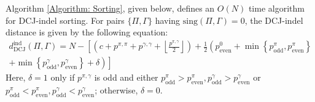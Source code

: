 \begin{theorem}
Algorithm \ref{Algorithm: Sorting}, given below, defines an $O(N)$ time algorithm for DCJ-indel sorting.  For pairs $\{\Pi, \Gamma\}$ having $\mathrm{sing}(\Pi, \Gamma) = 0$, the DCJ-indel distance is given by the following equation:
\begin{multline}
d_{\mathrm{DCJ}}^{\mathrm{ind}}(\Pi, \Gamma) = N - \left[\left(c + p^{\pi, \pi} + p^{\gamma, \gamma} + \left\lfloor \frac{p^{\pi, \gamma}}{2} \right\rfloor \right) + \frac{1}{2} \left(p^0_{\mathrm{even}} + \min{\left\{p^{\pi}_{\mathrm{odd}}, p^{\pi}_{\mathrm{even}}\right\}} \right. \right. \\
+ \left. \left. \min{\left\{p^{\gamma}_{\mathrm{odd}}, p^{\gamma}_{\mathrm{even}}\right\}} + \delta\right)\right]
\label{Equation: DCJ-Indel Distance}
\end{multline}
Here, $\delta = 1$ only if $p^{\pi, \gamma}$ is odd and either $p^{\pi}_{\mathrm{odd}} > p^{\pi}_{\mathrm{even}}, p^{\gamma}_{\mathrm{odd}} > p^{\gamma}_{\mathrm{even}}$ or \\$p^{\pi}_{\mathrm{odd}} < p^{\pi}_{\mathrm{even}}, p^{\gamma}_{\mathrm{odd}} < p^{\gamma}_{\mathrm{even}}$; otherwise, $\delta = 0$.
\label{Theorem: Main Theorem}
\end{theorem}

